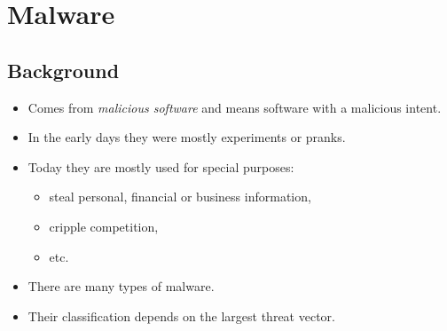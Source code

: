 \mode*




\section{Malware}

\subsection{Background}

\begin{frame}
  \begin{itemize}
    \item Comes from \emph{malicious software} and means software with 
      a malicious intent.

    \item In the early days they were mostly experiments or pranks.

    \item Today they are mostly used for special purposes:
      \begin{itemize}
        \item steal personal, financial or business information,
        \item cripple competition,
        \item etc.
      \end{itemize}

  \end{itemize}
\end{frame}

\begin{frame}
  \begin{itemize}
    \item There are many types of malware.

    \item Their classification depends on the largest threat vector.

  \end{itemize}
\end{frame}

